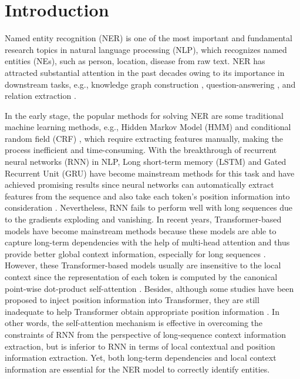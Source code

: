 \documentclass[11pt]{article}
\begin{document}
\section{Introduction}
Named entity recognition (NER) is one of the most important and fundamental research topics in natural language processing (NLP), which recognizes named entities (NEs), such as person, location, disease from raw text.
NER has attracted substantial attention in the past decades owing to its importance in downstream tasks, e.g., knowledge graph construction \cite{bosselut2019comet}, question-answering \cite{pergola2021boosting}, and relation extraction \cite{he2019classifying}.


In the early stage, the popular methods for solving NER are some traditional machine learning methods, e.g., Hidden Markov Model (HMM) \cite{morwal2012named} and conditional random field (CRF) \cite{mozharova2016combining}, which require extracting features manually, making the process inefficient and time-consuming.
With the breakthrough of recurrent neural networks (RNN) in NLP, Long short-term memory (LSTM) \cite{hochreiter1997long} and Gated Recurrent Unit (GRU) \cite{GRU} have become mainstream methods for this task and have achieved promising results since neural networks can automatically extract features from the sequence and also take each token's position information into consideration \cite{lample2016neural,chiu2016named,huang2015bidirectional}.
Nevertheless, RNN fails to perform well with long sequences due to the gradients exploding and vanishing.
In recent years, Transformer-based models \cite{vaswani2017attention} have become mainstream methods because these models are able to capture long-term dependencies with the help of multi-head attention and thus provide better global context information, especially for long sequences \cite{biobert,yangxlnet}.
However, these Transformer-based models usually are insensitive to the local context since the representation of each token is computed by the canonical point-wise dot-product self-attention \cite{li2019enhancing,huang2021missformer}.
Besides, although some studies \cite{shaw2018self,BERT,liu2019roberta} have been proposed to inject position information into Transformer, they are still inadequate to help Transformer obtain appropriate position information \cite{huang2020improve,qu2021explore}.
In other words, the self-attention mechanism is effective in overcoming the constraints of RNN from the perspective of long-sequence context information extraction, but is inferior to RNN in terms of local contextual and position information extraction.
Yet, both long-term dependencies and local context information are essential for the NER model to correctly identify entities.
\end{document}
